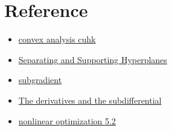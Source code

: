 \section{Reference}
\begin{itemize}
    \item \href{https://www.math.cuhk.edu.hk/course_builder/1920/math4230/}{convex analysis cuhk}
    \item \href{https://www.u.arizona.edu/~mwalker/econ519/Econ519LectureNotes/ConvexAnalysis.pdf}{Separating and Supporting Hyperplanes}
    \item \href{https://web.stanford.edu/class/ee364b/lectures/subgradients_notes.pdf}{subgradient}
    \item \href{https://link.springer.com/content/pdf/10.1007/0-387-31082-7_3.pdf}{The derivatives and the subdifferential}
    \item \href{https://sites.math.washington.edu/~burke/crs/408/notes/Math408_W2020/math408text.pdf}{nonlinear optimization 5.2}
\end{itemize}

